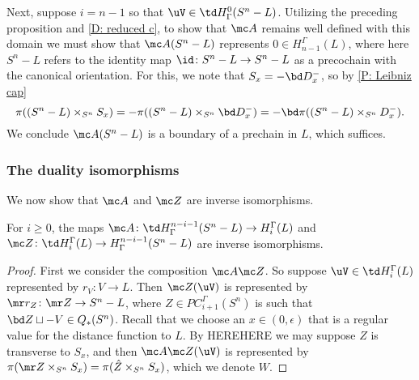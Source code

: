 \begin{example}
Next, suppose $i = n-1$ so that $\uV \in \td H^0_\Gamma(S^n-L)$.
Utilizing the preceding proposition and \cref{D: reduced c}, to show that $\mc A$ remains well defined with this domain we must show that $\mc A(S^n-L)$ represents $0 \in H_{n-1}^\Gamma(L)$, where here $S^n - L$ refers to the identity map $\id \colon S^n - L \to S^n - L$ as a precochain with the canonical orientation.
For this, we note that $S_x = - \bd D_x^-$, so by \cref{P: Leibniz cap}
$$\pi((S^n-L) \times_{S^n} S_x) = -\pi((S^n-L) \times_{S^n} \bd D_x^-) = -\bd \pi((S^n-L) \times_{S^n} D_x^-).$$
We conclude $\mc A(S^n - L)$ is a boundary of a prechain in $L$, which suffices.




\subsubsection{The duality isomorphisms} We now show that $\mc A$ and $\mc Z$ are inverse isomorphisms.


\begin{theorem}\label{T: alex duality}
	For $i \geq 0$, the maps  $\mc A \colon \td H^{n-i-1}_\Gamma(S^n-L) \to H_i^\Gamma(L)$ and $\mc Z \colon \td H_i^\Gamma(L) \to H^{n-i-1}_\Gamma(S^n-L)$ are inverse isomorphisms.
\end{theorem}

\begin{proof}
	First we consider the composition $\mc A \mc Z$.
	So suppose $\uV \in \td H_i^\Gamma(L)$ represented by $r_V \colon V \to L$.
	Then $\mc Z(\uV)$ is represented by $\mr r_Z \colon \mr Z \to S^n-L$, where $Z \in PC_{i+1}^\Gamma(S^n)$ is such that $\bd Z \sqcup -V \in Q_*(S^n)$.
	Recall that we choose an $x \in (0,\epsilon)$ that is a regular value for the distance function to $L$.
	By HEREHERE we may suppose $Z$ is transverse to $S_x$, and then $\mc A \mc Z(\uV)$ is represented by $\pi(\mr Z \times_{S^n} S_x) = \pi(\hat Z \times_{S^n} S_x)$, which we denote $W$.


\end{proof}
\end{example}
